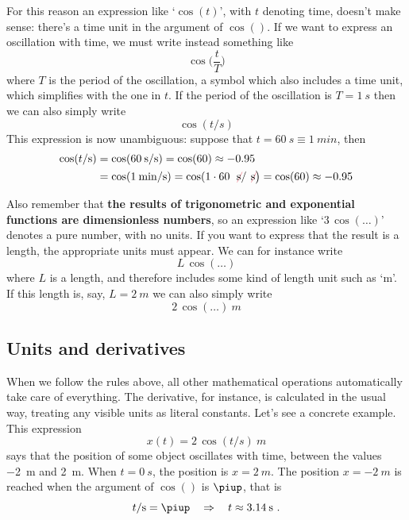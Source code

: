 \documentclass[a4paper,12pt,%
onecolumn,oneside,%
british%
]{memoir}
\newcommand*{\pu}{\piup}%
\newcommand*{\limplies}{\mathbin{\Rightarrow}}%
\renewcommand*{\|}[1][]{\nonscript\:#1\vert\nonscript\:\mathopen{}}
\begin{document}
For this reason an expression like \enquote*{$\cos(t)$}, with $t$ denoting time, doesn't make sense: there's a time unit in the argument of $\cos()$. If we want to express an oscillation with time, we must write instead something like
\begin{equation*}
  \cos\biggl(\frac{t}{T}\biggr)
\end{equation*}
where $T$ is the period of the oscillation, a symbol which also includes a time unit, which simplifies with the one in $t$. If the period of the oscillation is $T=\qty{1}{s}$ then we can also simply write
\begin{equation*}
  \cos(t/\unit{s})
\end{equation*}
This expression is now unambiguous: suppose that $t=\qty{60}{s}\equiv\qty{1}{min}$, then
\begin{equation*}
  \begin{aligned}
    \cos(t/\unit{s})
    &= \cos(\qty{60}{s}/\unit{s}) =\cos(60) \approx -0.95
    \\
    &= \cos(\qty{1}{min}/\unit{s}) =\cos(1\cdot 60\:\mathcolor{red}{\not}\!\unit{s}/\mathcolor{red}{\not}\!\unit{s}\bigr)
=\cos(60) \approx -0.95
  \end{aligned}
\end{equation*}

\smallskip

Also remember that \textbf{the results of trigonometric and exponential functions are dimensionless numbers}, so an expression like \enquote*{$3\,\cos(\dotso)$} denotes a pure number, with no units. If you want to express that the result is a length, the appropriate units must appear. We can for instance write
\begin{equation*}
  L\,\cos(\dotso)
\end{equation*}
where $L$ is a length, and therefore includes some kind of length unit such as \enquote*{\unit{m}}. If this length is, say, $L=\qty{2}{m}$ we can also simply write
\begin{equation*}
  2\,\cos(\dotso)\:\unit{m}
\end{equation*}

\subsection{Units and derivatives}
\label{sec:units_derivatives}

When we follow the rules above, all other mathematical operations automatically take care of everything. The derivative, for instance, is calculated in the usual way, treating any visible units as literal constants. Let's see a concrete example. This expression
\begin{equation*}
x(t) = 2\,\cos(t/\unit{s})\:\unit{m}
\end{equation*}
says that the position of some object oscillates with time, between the values \qty{-2}{m} and \qty{+2}{m}. When $t=\qty{0}{s}$, the position is $x=\qty{+2}{m}$. The position $x=\qty{-2}{m}$ is reached when the argument of $\cos()$ is $\pu$, that is
\begin{equation*}
  t/\unit{s} = \pu \quad\limplies\quad t\approx \qty{3.14}{s} \ .
\end{equation*}
\end{document}
